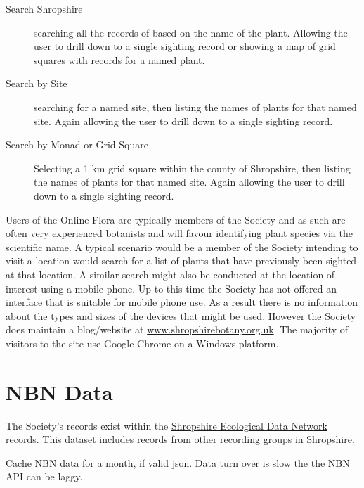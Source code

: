 \documentclass[a4paper,12pt,landscape]{article}
\begin{document}
\begin{multicols*}{2}
  \begin{description}
      \item[Search Shropshire]
        searching all the records of based on the name of the plant.
        Allowing the user to drill down to a single sighting record
        or
        showing a map of grid squares with records for a named plant.
      \item[Search by Site]
        searching for a named site,
        then listing the names of plants for that named site.
        Again allowing the user to drill down to a single sighting record.
      \item[Search by Monad or Grid Square]
        Selecting a 1 km grid square within the county of Shropshire,
        then listing the names of plants for that named site.
        Again allowing the user to drill down to a single sighting record.
  \end{description}

  Users of the Online Flora are typically
  members of the Society
  and
  as such are often very experienced botanists
  and will favour identifying
  plant species via the scientific name.
  A typical scenario would be a member of the Society
  intending to visit a location
  would search for a list of plants that have previously
  been sighted at that location.
  A similar search might also be
  conducted at the location of interest using a mobile phone.
  Up to this time the Society has not offered an interface that is suitable for mobile phone use.
  As a result there is no information about the types and sizes of the devices that might be used.
  However the Society does maintain a blog/website at 
  \href{https://www.shropshirebotany.org.uk/}{www.shropshirebotany.org.uk}.
  The majority of visitors to the site
  use Google Chrome on a Windows platform.

  \section{NBN Data}
  The Society's records exist within
  the \href{https://registry.nbnatlas.org/public/show/dp120}{Shropshire Ecological Data Network records}.
  This dataset includes records from other recording groups in Shropshire.

  \begin{description}
    \item Cache NBN data for a month, if valid json.
      Data turn over is slow the the NBN API can be laggy. 
    \item[] 
  \end{description} 

\end{multicols*}
\end{document}
